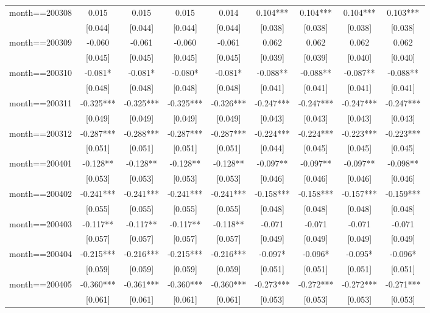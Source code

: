 \documentclass[]{article}
\begin{document}
\begin{tabular}{lcccccccc}
month==200308 & 0.015 & 0.015 & 0.015 & 0.014 & 0.104*** & 0.104*** & 0.104*** & 0.103*** \\
 & [0.044] & [0.044] & [0.044] & [0.044] & [0.038] & [0.038] & [0.038] & [0.038] \\
month==200309 & -0.060 & -0.061 & -0.060 & -0.061 & 0.062 & 0.062 & 0.062 & 0.062 \\
 & [0.045] & [0.045] & [0.045] & [0.045] & [0.039] & [0.039] & [0.040] & [0.040] \\
month==200310 & -0.081* & -0.081* & -0.080* & -0.081* & -0.088** & -0.088** & -0.087** & -0.088** \\
 & [0.048] & [0.048] & [0.048] & [0.048] & [0.041] & [0.041] & [0.041] & [0.041] \\
month==200311 & -0.325*** & -0.325*** & -0.325*** & -0.326*** & -0.247*** & -0.247*** & -0.247*** & -0.247*** \\
 & [0.049] & [0.049] & [0.049] & [0.049] & [0.043] & [0.043] & [0.043] & [0.043] \\
month==200312 & -0.287*** & -0.288*** & -0.287*** & -0.287*** & -0.224*** & -0.224*** & -0.223*** & -0.223*** \\
 & [0.051] & [0.051] & [0.051] & [0.051] & [0.044] & [0.045] & [0.045] & [0.045] \\
month==200401 & -0.128** & -0.128** & -0.128** & -0.128** & -0.097** & -0.097** & -0.097** & -0.098** \\
 & [0.053] & [0.053] & [0.053] & [0.053] & [0.046] & [0.046] & [0.046] & [0.046] \\
month==200402 & -0.241*** & -0.241*** & -0.241*** & -0.241*** & -0.158*** & -0.158*** & -0.157*** & -0.159*** \\
 & [0.055] & [0.055] & [0.055] & [0.055] & [0.048] & [0.048] & [0.048] & [0.048] \\
month==200403 & -0.117** & -0.117** & -0.117** & -0.118** & -0.071 & -0.071 & -0.071 & -0.071 \\
 & [0.057] & [0.057] & [0.057] & [0.057] & [0.049] & [0.049] & [0.049] & [0.049] \\
month==200404 & -0.215*** & -0.216*** & -0.215*** & -0.216*** & -0.097* & -0.096* & -0.095* & -0.096* \\
 & [0.059] & [0.059] & [0.059] & [0.059] & [0.051] & [0.051] & [0.051] & [0.051] \\
month==200405 & -0.360*** & -0.361*** & -0.360*** & -0.360*** & -0.273*** & -0.272*** & -0.272*** & -0.271*** \\
 & [0.061] & [0.061] & [0.061] & [0.061] & [0.053] & [0.053] & [0.053] & [0.053] \\

\end{tabular}
\end{document}
